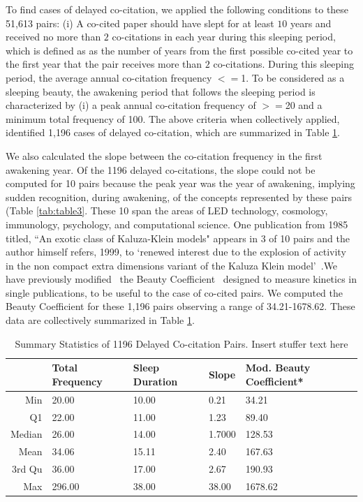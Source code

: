 \documentclass[utf8]{frontiersSCNS}
\newcommand\Tstrut{\rule{0pt}{2.9ex}} %
\begin{document}
To find cases of delayed co-citation, we applied the following conditions to these 51,613 pairs: (i)  A co-cited paper should have slept for at least $10$ years and received no more than $2$ co-citations in each year during this sleeping period, which is defined as as the number of years from the first possible co-cited year to the first year that the pair receives more than $2$ co-citations. During this sleeping period, the average annual co-citation frequency $<=$1.  To be considered as a sleeping beauty, the awakening period that follows the sleeping period is characterized by (i) a peak annual co-citation frequency of $>=$20 and a minimum total frequency of 100. The above criteria when collectively applied, identified 1,196 cases of delayed co-citation, which are summarized in Table \ref{tab:table2}. 


We also calculated the slope between the co-citation frequency in the first awakening year.  Of the 1196 delayed co-citations, the slope could not be computed for 10 pairs because the peak year was the year of awakening, implying sudden recognition, during awakening, of the concepts represented by these pairs (Table \ref{tab:table3}. These 10 span the areas of LED technology, cosmology, immunology, psychology, and computational science. One publication from 1985 titled, ``An exotic class of Kaluza-Klein models" appears in 3 of 10 pairs and the author himself refers, 1999, to `renewed interest due to the explosion of activity in the non compact extra dimensions variant of the Kaluza Klein model'~\citep{visser_1999}.We have previously modified~\citep{devarakonda_2020}  the Beauty Coefficient~\citep{Ke2015} designed to measure kinetics in single publications, to be useful to the case of co-cited pairs. We computed the Beauty Coefficient for these 1,196 pairs observing a range of 34.21-1678.62. These data are collectively summarized in Table \ref{tab:table2}.  

\begin{table}[ht]
\caption{Summary Statistics of 1196 Delayed Co-citation Pairs. Insert stuffer text here}%
\centering %
\begin{center}
\begin{tabular}{rllll} 
& Total Frequency & Sleep Duration & Slope & Mod. Beauty Coefficient* \\
\hline %
Min &  20.00 & 10.00 & 0.21 & 34.21   \Tstrut\\ 
Q1  &  22.00 & 11.00  & 1.23 & 89.40   \\ 
Median & 26.00 & 14.00 & 1.7000 & 128.53   \\ 
Mean & 34.06 & 15.11 & 2.40 & 167.63   \\ 
3rd Qu & 36.00 & 17.00 & 2.67 & 190.93   \\ 
Max & 296.00 & 38.00  & 38.00  & 1678.62   \\ 
\hline
\end{tabular}
\end{center}
\label{tab:table2} %
\end{table}
\end{document}
